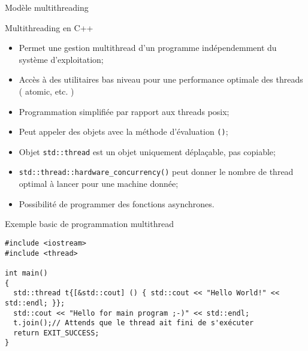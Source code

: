 \documentclass[handout,10pt]{beamer}
\begin{document}
\begin{frame}[fragile]{Modèle multithreading}
 \tiny
 \begin{block}{Multithreading en C++}
  \begin{itemize}
   \item Permet une gestion multithread d'un programme indépendemment du système d'exploitation;
   \item Accès à des utilitaires bas niveau pour une performance optimale des threads ( atomic, etc. )
   \item Programmation simplifiée par rapport aux threads posix;
   \item Peut appeler des objets avec la méthode d'évaluation \lstinline$()$;
   \item Objet \lstinline$std::thread$ est un objet uniquement déplaçable, pas copiable;
   \item \lstinline$std::thread::hardware_concurrency()$ peut donner le nombre de thread optimal à lancer pour une machine donnée;
   \item Possibilité de programmer des fonctions asynchrones.
  \end{itemize}
 \end{block}

 \begin{exampleblock}{Exemple basic de programmation multithread}
\begin{lstlisting}
#include <iostream>
#include <thread>

int main()
{
  std::thread t{[&std::cout] () { std::cout << "Hello World!" << std::endl; }};
  std::cout << "Hello for main program ;-)" << std::endl;
  t.join();// Attends que le thread ait fini de s'exécuter
  return EXIT_SUCCESS;
}
\end{lstlisting}
 \end{exampleblock}
\end{frame}
\end{document}
